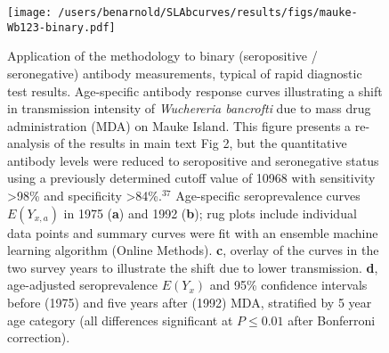 \documentclass[11pt]{article}
\begin{document}
\clearpage
\begin{figure}[htbp]
\begin{center}
\texttt{[image: /users/benarnold/SLAbcurves/results/figs/mauke-Wb123-binary.pdf]}
\begin{minipage}{\textwidth}
\caption{Application of the methodology to binary (seropositive / seronegative) antibody measurements, typical of rapid diagnostic test results. Age-specific antibody response curves illustrating a shift in transmission intensity of \textit{Wuchereria bancrofti} due to mass drug administration (MDA) on Mauke Island.  This figure presents a re-analysis of the results in main text Fig 2, but the quantitative antibody levels were reduced to seropositive and seronegative status using a previously determined cutoff value of 10968 with sensitivity >98\% and specificity >84\%.$^{37}$ Age-specific seroprevalence curves $E(Y_{x,a})$ in 1975 (\textbf{a}) and 1992 (\textbf{b}); rug plots include individual data points and summary curves were fit with an ensemble machine learning algorithm (Online Methods). \textbf{c}, overlay of the curves in the two survey years to illustrate the shift due to lower transmission.  \textbf{d}, age-adjusted seroprevalence $E(Y_{x})$ and 95\% confidence intervals before (1975) and five years after (1992) MDA, stratified by 5 year age category (all differences significant at $P\leq0.01$ after Bonferroni correction).}
\label{fig:maukebina}
\end{minipage}
\end{center}
\end{figure}
\end{document}
